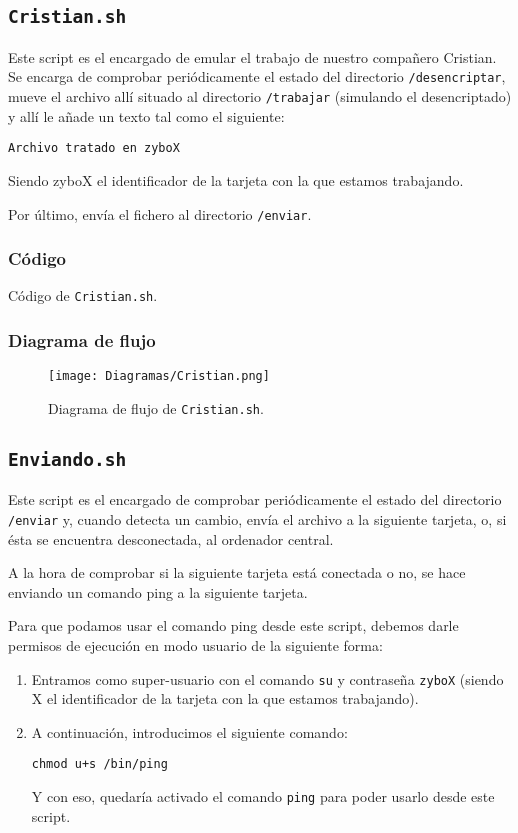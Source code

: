 \documentclass[12pt,letterpaper]{article}
\begin{document}
\newpage
\subsection{\texttt{Cristian.sh}}
Este script es el encargado de emular el trabajo de nuestro compañero Cristian. Se encarga de comprobar periódicamente el estado del directorio \texttt{/desencriptar}, mueve el archivo allí situado al directorio \texttt{/trabajar} (simulando el desencriptado) y allí le añade un texto tal como el siguiente:
\begin{center}
	\texttt{Archivo tratado en zyboX}
\end{center}

Siendo zyboX el identificador de la tarjeta con la que estamos trabajando.

Por último, envía el fichero al directorio \texttt{/enviar}.

\subsubsection{Código}

\begin{center}
	Código de \texttt{Cristian.sh}.
\end{center}

\subsubsection{Diagrama de flujo}
\begin{figure}[h]
	\centering
	\texttt{[image: Diagramas/Cristian.png]}
	\caption{Diagrama de flujo de \texttt{Cristian.sh}.}
	\label{Diagrama de flujo de Cristian.sh}
\end{figure}

\newpage
\subsection{\texttt{Enviando.sh}}
Este script es el encargado de comprobar periódicamente el estado del directorio \texttt{/enviar} y, cuando detecta un cambio, envía el archivo a la siguiente tarjeta, o, si ésta se encuentra desconectada, al ordenador central.

A la hora de comprobar si la siguiente tarjeta está conectada o no, se hace enviando un comando ping a la siguiente tarjeta.

Para que podamos usar el comando ping desde este script, debemos darle permisos de ejecución en modo usuario de la siguiente forma:
\begin{enumerate}
	\item Entramos como super-usuario con el comando \texttt{su} y contraseña \texttt{zyboX} (siendo X el identificador de la tarjeta con la que estamos trabajando).
	\item A continuación, introducimos el siguiente comando:
	\begin{center}
		\texttt{chmod u+s /bin/ping}
	\end{center}
	Y con eso, quedaría activado el comando \texttt{ping} para poder usarlo desde este script.
\end{enumerate}
\end{document}
